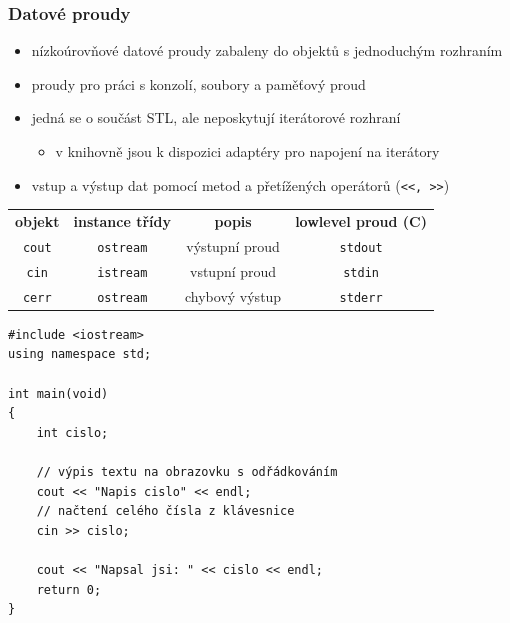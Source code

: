 \begin{frame}[fragile]
\frametitle{Datové proudy}

\begin{block}{}
\begin{itemize}
\item nízkoúrovňové datové proudy zabaleny do objektů s jednoduchým rozhraním
\item proudy pro práci s konzolí, soubory a paměťový proud
\item jedná se o součást STL, ale neposkytují iterátorové rozhraní
\begin{itemize}
\item v knihovně jsou k dispozici adaptéry pro napojení na iterátory
\end{itemize}
\item vstup a výstup dat pomocí metod a přetížených operátorů (\lstinline|<<, >>|)
\end{itemize}
\end{block}


\begin{block}{}
\centering
\begin{tabular}{cccc}
\bfseries objekt & \bfseries instance třídy & \bfseries popis & \bfseries lowlevel proud (C) \\
\lstinline|cout| & \lstinline|ostream| & výstupní proud  & \lstinline|stdout| \\
\lstinline|cin| & \lstinline|istream| & vstupní proud & \lstinline|stdin| \\
\lstinline|cerr| & \lstinline|ostream| & chybový výstup & \lstinline|stderr| \\
\end{tabular}
\end{block}
\end{frame}





\begin{frame}[fragile]
\begin{yesblock}
\begin{lstlisting}
#include <iostream>
using namespace std;

int main(void)
{ 
	int cislo; 

	// výpis textu na obrazovku s odřádkováním
	cout << "Napis cislo" << endl; 
	// načtení celého čísla z klávesnice
	cin >> cislo; 

	cout << "Napsal jsi: " << cislo << endl; 
	return 0; 
}
\end{lstlisting}
\end{yesblock}
\end{frame}




